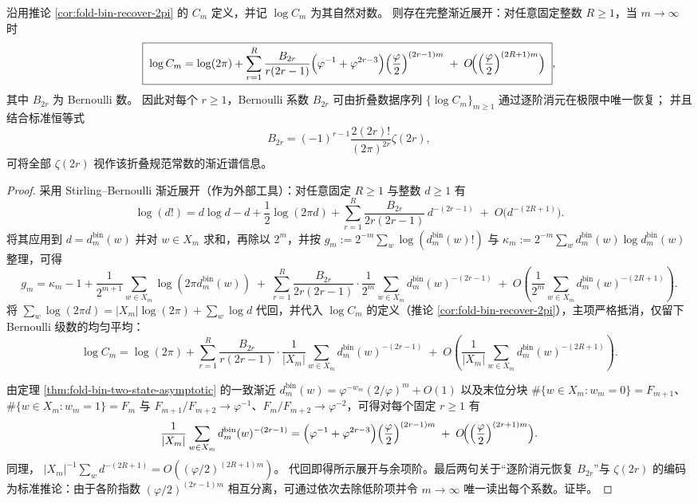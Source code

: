 \begin{theorem}\label{thm:fold-bin-gauge-constant-stirling-bernoulli-hierarchy}
沿用推论 \ref{cor:fold-bin-recover-2pi} 的 \(C_m\) 定义，并记 \(\log C_m\) 为其自然对数。
则存在完整渐近展开：对任意固定整数 \(R\ge 1\)，当 \(m\to\infty\) 时
\[
\boxed{\;
\log C_m
=\log(2\pi)+
\sum_{r=1}^{R}
\frac{B_{2r}}{r(2r-1)}
\Bigl(\varphi^{-1}+\varphi^{2r-3}\Bigr)
\Bigl(\frac{\varphi}{2}\Bigr)^{(2r-1)m}
\;+\;
O\!\Bigl(\Bigl(\frac{\varphi}{2}\Bigr)^{(2R+1)m}\Bigr)\; } ,
\]
其中 \(B_{2r}\) 为 Bernoulli 数。
因此对每个 \(r\ge 1\)，Bernoulli 系数 \(B_{2r}\) 可由折叠数据序列 \(\{\log C_m\}_{m\ge 1}\) 通过逐阶消元在极限中唯一恢复；
并且结合标准恒等式
\[
B_{2r}=(-1)^{r-1}\frac{2(2r)!}{(2\pi)^{2r}}\zeta(2r),
\]
可将全部 \(\zeta(2r)\) 视作该折叠规范常数的渐近谱信息。
\end{theorem}
\begin{proof}
采用 Stirling--Bernoulli 渐近展开（作为外部工具）：对任意固定 \(R\ge 1\) 与整数 \(d\ge 1\) 有
\[
\log(d!)=d\log d-d+\frac12\log(2\pi d)+
\sum_{r=1}^{R}\frac{B_{2r}}{2r(2r-1)}\,d^{-(2r-1)}
\;+\;
O\!\bigl(d^{-(2R+1)}\bigr).
\]
将其应用到 \(d=d^{\mathrm{bin}}_m(w)\) 并对 \(w\in X_m\) 求和，再除以 \(2^m\)，并按
\(
g_m:=2^{-m}\sum_w\log(d^{\mathrm{bin}}_m(w)!)
\)
与
\(
\kappa_m:=2^{-m}\sum_w d^{\mathrm{bin}}_m(w)\log d^{\mathrm{bin}}_m(w)
\)
整理，可得
\[
g_m
=\kappa_m-1+\frac{1}{2^{m+1}}\sum_{w\in X_m}\log(2\pi d^{\mathrm{bin}}_m(w))
\;+\;
\sum_{r=1}^{R}\frac{B_{2r}}{2r(2r-1)}\cdot
\frac{1}{2^{m}}\sum_{w\in X_m} d^{\mathrm{bin}}_m(w)^{-(2r-1)}
\;+\;
O\!\left(\frac{1}{2^{m}}\sum_{w\in X_m} d^{\mathrm{bin}}_m(w)^{-(2R+1)}\right).
\]
将
\(
\sum_w\log(2\pi d)=|X_m|\log(2\pi)+\sum_w\log d
\)
代回，并代入 \(\log C_m\) 的定义（推论 \ref{cor:fold-bin-recover-2pi}），主项严格抵消，仅留下 Bernoulli 级数的均匀平均：
\[
\log C_m
=\log(2\pi)+
\sum_{r=1}^{R}\frac{B_{2r}}{r(2r-1)}\cdot
\frac{1}{|X_m|}\sum_{w\in X_m} d^{\mathrm{bin}}_m(w)^{-(2r-1)}
\;+\;
O\!\left(\frac{1}{|X_m|}\sum_{w\in X_m} d^{\mathrm{bin}}_m(w)^{-(2R+1)}\right).
\]
\par
由定理 \ref{thm:fold-bin-two-state-asymptotic} 的一致渐近
\(
d^{\mathrm{bin}}_m(w)=\varphi^{-w_m}(2/\varphi)^m+O(1)
\)
以及末位分块 \(\#\{w\in X_m:w_m=0\}=F_{m+1}\)、\(\#\{w\in X_m:w_m=1\}=F_m\) 与 \(F_{m+1}/F_{m+2}\to\varphi^{-1}\)、\(F_m/F_{m+2}\to\varphi^{-2}\)，可得对每个固定 \(r\ge 1\) 有
\[
\frac{1}{|X_m|}\sum_{w\in X_m} d^{\mathrm{bin}}_m(w)^{-(2r-1)}
=\Bigl(\varphi^{-1}+\varphi^{2r-3}\Bigr)\Bigl(\frac{\varphi}{2}\Bigr)^{(2r-1)m}
\;+\;
O\!\Bigl(\Bigl(\frac{\varphi}{2}\Bigr)^{(2r+1)m}\Bigr).
\]
同理，
\(
|X_m|^{-1}\sum_w d^{-(2R+1)}
=O((\varphi/2)^{(2R+1)m})
\)。
代回即得所示展开与余项阶。最后两句关于“逐阶消元恢复 \(B_{2r}\)”与 \(\zeta(2r)\) 的编码为标准推论：由于各阶指数 \((\varphi/2)^{(2r-1)m}\) 相互分离，可通过依次去除低阶项并令 \(m\to\infty\) 唯一读出每个系数。证毕。
\end{proof}

